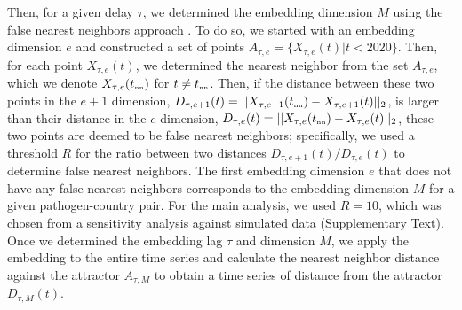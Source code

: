\documentclass[12pt]{article}
\newcommand{\tsub}[2]{#1_{{\textrm{\tiny #2}}}}
\begin{document}
Then, for a given delay $\tau$, we determined the embedding dimension $M$ using the false nearest neighbors approach \citep{kennel1992determining,tan2023selecting}.
To do so, we started with an embedding dimension $e$ and constructed a set of points $A_{\tau,e}= \{X_{\tau,e}(t) | t < 2020\}$.
Then, for each point $X_{\tau,e}(t)$, we determined the nearest neighbor from the set $A_{\tau,e}$, which we denote $X_{\tau,e}(\tsub{t}{nn})$ for $t \neq \tsub{t}{nn}$.
Then, if the distance between these two points in the $e+1$ dimension, $D_{\tau,e+1}(t) = ||X_{\tau,e+1}(\tsub{t}{nn})-X_{\tau,e+1}(t)||_2$, is larger than their distance in the $e$ dimension, $D_{\tau,e}(t) = ||X_{\tau,e}(\tsub{t}{nn})-X_{\tau,e}(t)||_2$, these two points are deemed to be false nearest neighbors;
specifically, we used a threshold $R$ for the ratio between two distances $D_{\tau,e+1}(t)/D_{\tau,e}(t)$ to determine false nearest neighbors.
The first embedding dimension $e$ that does not have any false nearest neighbors corresponds to the embedding dimension $M$ for a given pathogen-country pair.
For the main analysis, we used $R=10$, which was chosen from a sensitivity analysis against simulated data (Supplementary Text).
Once we determined the embedding lag $\tau$ and dimension $M$, we apply the embedding to the entire time series and calculate the nearest neighbor distance against the attractor $A_{\tau,M}$ to obtain a time series of distance from the attractor $D_{\tau,M}(t)$.
\end{document}
